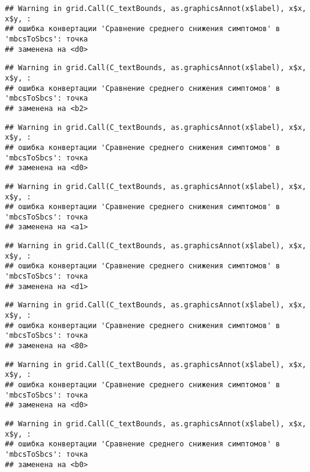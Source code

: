 \documentclass[
]{article}
\begin{document}
\begin{verbatim}
## Warning in grid.Call(C_textBounds, as.graphicsAnnot(x$label), x$x, x$y, :
## ошибка конвертации 'Сравнение среднего снижения симптомов' в 'mbcsToSbcs': точка
## заменена на <d0>
\end{verbatim}

\begin{verbatim}
## Warning in grid.Call(C_textBounds, as.graphicsAnnot(x$label), x$x, x$y, :
## ошибка конвертации 'Сравнение среднего снижения симптомов' в 'mbcsToSbcs': точка
## заменена на <b2>
\end{verbatim}

\begin{verbatim}
## Warning in grid.Call(C_textBounds, as.graphicsAnnot(x$label), x$x, x$y, :
## ошибка конвертации 'Сравнение среднего снижения симптомов' в 'mbcsToSbcs': точка
## заменена на <d0>
\end{verbatim}

\begin{verbatim}
## Warning in grid.Call(C_textBounds, as.graphicsAnnot(x$label), x$x, x$y, :
## ошибка конвертации 'Сравнение среднего снижения симптомов' в 'mbcsToSbcs': точка
## заменена на <a1>
\end{verbatim}

\begin{verbatim}
## Warning in grid.Call(C_textBounds, as.graphicsAnnot(x$label), x$x, x$y, :
## ошибка конвертации 'Сравнение среднего снижения симптомов' в 'mbcsToSbcs': точка
## заменена на <d1>
\end{verbatim}

\begin{verbatim}
## Warning in grid.Call(C_textBounds, as.graphicsAnnot(x$label), x$x, x$y, :
## ошибка конвертации 'Сравнение среднего снижения симптомов' в 'mbcsToSbcs': точка
## заменена на <80>
\end{verbatim}

\begin{verbatim}
## Warning in grid.Call(C_textBounds, as.graphicsAnnot(x$label), x$x, x$y, :
## ошибка конвертации 'Сравнение среднего снижения симптомов' в 'mbcsToSbcs': точка
## заменена на <d0>
\end{verbatim}

\begin{verbatim}
## Warning in grid.Call(C_textBounds, as.graphicsAnnot(x$label), x$x, x$y, :
## ошибка конвертации 'Сравнение среднего снижения симптомов' в 'mbcsToSbcs': точка
## заменена на <b0>
\end{verbatim}
\end{document}
